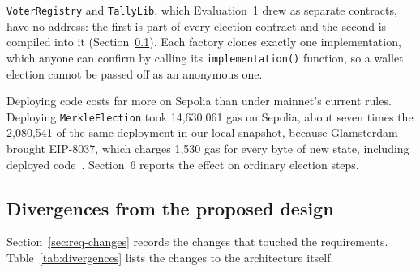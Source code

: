 \texttt{VoterRegistry} and \texttt{TallyLib}, which Evaluation~1 drew as
separate contracts, have no address: the first is part of every election
contract and the second is compiled into it (Section~\ref{sec:divergences}).
Each factory clones exactly one implementation, which anyone can confirm by
calling its \texttt{implementation()} function, so a wallet election cannot be
passed off as an anonymous one.

Deploying code costs far more on Sepolia than under mainnet's current rules.
Deploying \texttt{MerkleElection} took 14,630,061 gas on Sepolia, about seven
times the 2,080,541 of the same deployment in our local snapshot, because
Glamsterdam~\cite{glamsterdam} brought EIP-8037, which charges 1,530 gas for
every byte of new state, including deployed code~\cite{eip8037}. Section~6
reports the effect on ordinary election steps.

\subsection{Divergences from the proposed design}\label{sec:divergences}

Section~\ref{sec:req-changes} records the changes that touched the
requirements. Table~\ref{tab:divergences} lists the changes to the architecture itself.

